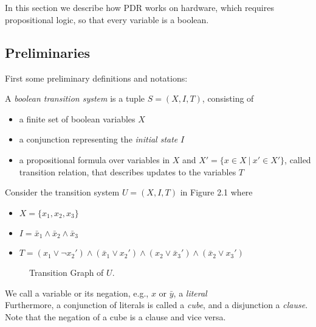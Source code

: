 \documentclass[11pt, a4paper, BCOR=10mm, ngerman]{scrbook}
\begin{document}
\chapter{}
\label{PDR}
In this section we describe how PDR works on hardware, which requires propositional logic, so that every variable is a boolean.



\section{Preliminaries} \vspace{-5mm}
First some preliminary definitions and notations:  \par

A \textsl{boolean transition system} is a tuple $S = (X, I, T)$, consisting of
\begin{itemize}
	\item a finite set of boolean variables $X$
	\item a conjunction representing the \textsl{initial state} $I$
	\item a propositional formula over variables in $X$ and $X' = \{x \in X \ | \ x' \in X'\}$, called transition relation, that describes updates to the variables $T$
\end{itemize}
\par
Consider the transition system $U = (X, I, T)$ in Figure 2.1 where
\begin{itemize}
	\item $ X= \{x_1, x_2, x_3\}$
	\item $I = \bar x_1 \land \bar x_2 \land \bar x_3$
	\item $T = (x_1 \lor \neg x_2' ) \land ( \bar x_1 \lor x_2') \land (x_2 \lor \bar x_3') \land ( \bar x_2 \lor x_3')$
\end{itemize}
\pagebreak

\begin{figure}[H]
	\centering
	
	\caption{Transition Graph of $U$.}
	\label{ex1}
\end{figure}

We call a variable or its negation, e.g., $x \text{ or } \bar y$, a \textsl{literal} \\
Furthermore, a conjunction of literals is called a \textsl{cube}, and a disjunction a \textsl{clause}. \\
Note that the negation of a cube is a clause and vice versa. \par
\end{document}
